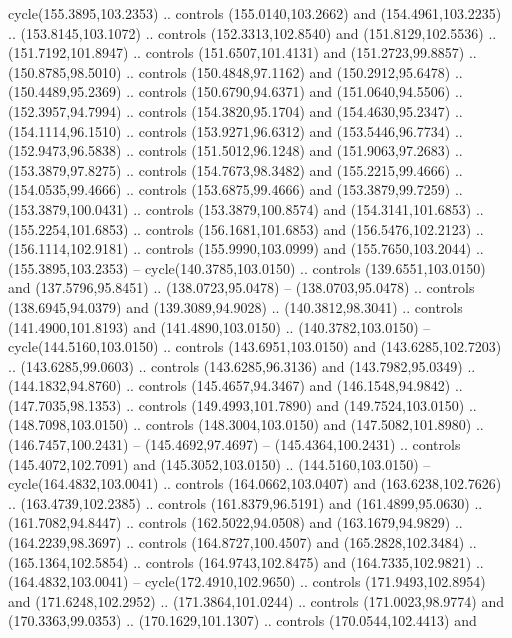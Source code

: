 \begin{scope}[cm={{1.25,0.0,0.0,-1.25,(0.0,442.91375)}}]
    cycle(155.3895,103.2353) .. controls (155.0140,103.2662) and
    (154.4961,103.2235) .. (153.8145,103.1072) .. controls (152.3313,102.8540) and
    (151.8129,102.5536) .. (151.7192,101.8947) .. controls (151.6507,101.4131) and
    (151.2723,99.8857) .. (150.8785,98.5010) .. controls (150.4848,97.1162) and
    (150.2912,95.6478) .. (150.4489,95.2369) .. controls (150.6790,94.6371) and
    (151.0640,94.5506) .. (152.3957,94.7994) .. controls (154.3820,95.1704) and
    (154.4630,95.2347) .. (154.1114,96.1510) .. controls (153.9271,96.6312) and
    (153.5446,96.7734) .. (152.9473,96.5838) .. controls (151.5012,96.1248) and
    (151.9063,97.2683) .. (153.3879,97.8275) .. controls (154.7673,98.3482) and
    (155.2215,99.4666) .. (154.0535,99.4666) .. controls (153.6875,99.4666) and
    (153.3879,99.7259) .. (153.3879,100.0431) .. controls (153.3879,100.8574) and
    (154.3141,101.6853) .. (155.2254,101.6853) .. controls (156.1681,101.6853) and
    (156.5476,102.2123) .. (156.1114,102.9181) .. controls (155.9990,103.0999) and
    (155.7650,103.2044) .. (155.3895,103.2353) -- cycle(140.3785,103.0150) ..
    controls (139.6551,103.0150) and (137.5796,95.8451) .. (138.0723,95.0478) --
    (138.0703,95.0478) .. controls (138.6945,94.0379) and (139.3089,94.9028) ..
    (140.3812,98.3041) .. controls (141.4900,101.8193) and (141.4890,103.0150) ..
    (140.3782,103.0150) -- cycle(144.5160,103.0150) .. controls
    (143.6951,103.0150) and (143.6285,102.7203) .. (143.6285,99.0603) .. controls
    (143.6285,96.3136) and (143.7982,95.0349) .. (144.1832,94.8760) .. controls
    (145.4657,94.3467) and (146.1548,94.9842) .. (147.7035,98.1353) .. controls
    (149.4993,101.7890) and (149.7524,103.0150) .. (148.7098,103.0150) .. controls
    (148.3004,103.0150) and (147.5082,101.8980) .. (146.7457,100.2431) --
    (145.4692,97.4697) -- (145.4364,100.2431) .. controls (145.4072,102.7091) and
    (145.3052,103.0150) .. (144.5160,103.0150) -- cycle(164.4832,103.0041) ..
    controls (164.0662,103.0407) and (163.6238,102.7626) .. (163.4739,102.2385) ..
    controls (161.8379,96.5191) and (161.4899,95.0630) .. (161.7082,94.8447) ..
    controls (162.5022,94.0508) and (163.1679,94.9829) .. (164.2239,98.3697) ..
    controls (164.8727,100.4507) and (165.2828,102.3484) .. (165.1364,102.5854) ..
    controls (164.9743,102.8475) and (164.7335,102.9821) .. (164.4832,103.0041) --
    cycle(172.4910,102.9650) .. controls (171.9493,102.8954) and
    (171.6248,102.2952) .. (171.3864,101.0244) .. controls (171.0023,98.9774) and
    (170.3363,99.0353) .. (170.1629,101.1307) .. controls (170.0544,102.4413) and

\end{scope}
